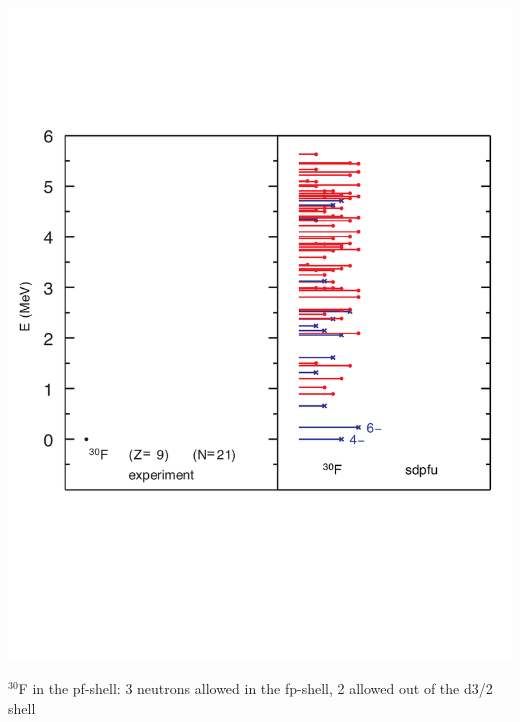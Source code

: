 \documentclass[12pt]{article}
\begin{document}
\includegraphics[width=\textwidth]{f_30u-2n.pdf} 
    
   \newpage
   
$^{30}$F in the pf-shell: 3 neutrons allowed in the fp-shell, 2 allowed out of the d3/2 shell
\end{document}
